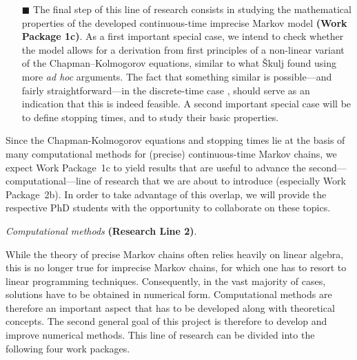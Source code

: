 \documentclass[11pt,dvipsnames,usenames,a4paper]{article}
\begin{document}
\begin{itemize}
\item[\tiny$\blacksquare$]
The final step of this line of research consists in studying the mathematical properties of the developed continuous-time imprecise Markov model {\bf(Work Package 1c)}.
As a first important special case, we intend to check whether the model allows for a derivation from first principles of a non-linear variant of the Chapman--Kolmogorov equations, similar to what \v{S}kulj \cite{skulj2015:continuous:bounds} found using more {\itshape ad hoc} arguments.
The fact that something similar is possible---and fairly straightforward---in the discrete-time case \cite{cooman2008}, should serve as an indication that this is indeed feasible. A second important special case will be to define stopping times, and to study their basic properties.\vspace{8pt}
\end{itemize}

Since the Chapman-Kolmogorov equations and stopping times lie at the basis of many computational methods for (precise) continuous-time Markov chains, we expect Work Package~1c to yield results that are useful to advance the second---computational---line of research that we are about to introduce (especially Work Package~2b). In order to take advantage of this overlap, we will provide the respective PhD students with the opportunity to collaborate on these topics.


\vspace{8pt}


\emph{Computational methods} {\bf (Research Line 2)}.
\vspace{3pt}

While the theory of precise Markov chains often relies heavily on linear algebra, this is no longer true for imprecise Markov chains, for which one has to resort to linear programming techniques. Consequently, in the vast majority of cases, solutions have to be obtained in numerical form.
Computational methods are therefore an important aspect that has to be developed along with theoretical concepts. 
The second general goal of this project is therefore to develop and improve numerical methods. This line of research can be divided into the following four work packages.




\end{document}
